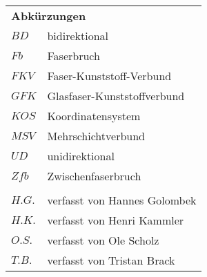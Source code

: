 \begin{longtable}[l]{ll}
\multicolumn{2}{l}{\textbf{Abkürzungen}}\\
$ BD $& bidirektional\\
$Fb$&Faserbruch\\
$FKV$&Faser-Kunststoff-Verbund\\
$GFK$& Glasfaser-Kunststoffverbund\\
 $ KOS$& Koordinatensystem\\
$MSV$&Mehrschichtverbund\\
$UD$&unidirektional\\
$Zfb$&Zwischenfaserbruch\\
&\\
$H.G.$& verfasst von Hannes Golombek\\
$H.K.$& verfasst von Henri Kammler\\
$O.S.$& verfasst von Ole Scholz\\
$T.B.$& verfasst von Tristan Brack\\
\end{longtable}

